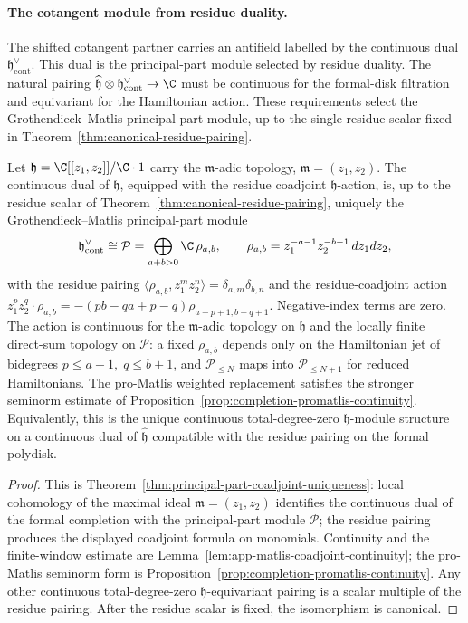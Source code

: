 \documentclass[11pt]{memoir}
\begin{document}
\paragraph{The cotangent module from residue duality.}
The shifted cotangent partner carries an antifield labelled by the
continuous dual \(\mathfrak h^\vee_{\mathrm{cont}}\).  This dual is the
principal-part module selected by residue duality.  The natural pairing
\(\widehat{\mathfrak h}\otimes\mathfrak h^\vee_{\mathrm{cont}}\to\C\)
must be continuous for the formal-disk filtration and equivariant for
the Hamiltonian action.  These requirements select the
Grothendieck--Matlis principal-part module, up to the single residue
scalar fixed in Theorem~\ref{thm:canonical-residue-pairing}.

\begin{thm}\label{thm:hbf-cotangent-uniqueness-summary}
  Let \(\mathfrak h=\C[[z_1,z_2]]/\C\cdot1\) carry the
  \(\mathfrak m\)-adic topology, \(\mathfrak m=(z_1,z_2)\).  The
  continuous dual of \(\mathfrak h\), equipped with the residue
  coadjoint \(\mathfrak h\)-action, is, up to the residue scalar of
  Theorem~\ref{thm:canonical-residue-pairing}, uniquely the
  Grothendieck--Matlis principal-part module
  \[
    \mathfrak h^\vee_{\mathrm{cont}}\cong\mathcal P
    =\bigoplus_{a+b>0}\C\,\rho_{a,b},\qquad
    \rho_{a,b}=z_1^{-a-1}z_2^{-b-1}\,dz_1dz_2,
  \]
  with the residue pairing
  \(\langle\rho_{a,b},z_1^mz_2^n\rangle=\delta_{a,m}\delta_{b,n}\) and
  the residue-coadjoint action
  \(z_1^pz_2^q\cdot\rho_{a,b}=-(pb-qa+p-q)\rho_{a-p+1,b-q+1}\).
  Negative-index terms are zero.  The action is continuous for the
  \(\mathfrak m\)-adic topology on \(\mathfrak h\) and the locally
  finite direct-sum topology on \(\mathcal P\): a fixed
  \(\rho_{a,b}\) depends only on the Hamiltonian jet of bidegrees
  \(p\leq a+1,\;q\leq b+1\), and
  \(\mathcal P_{\leq N}\) maps into \(\mathcal P_{\leq N+1}\) for
  reduced Hamiltonians.  The pro-Matlis weighted replacement satisfies
  the stronger seminorm estimate of
  Proposition~\ref{prop:completion-promatlis-continuity}.  Equivalently,
  this is the unique continuous total-degree-zero \(\mathfrak h\)-module
  structure on a continuous dual of \(\widehat{\mathfrak h}\) compatible
  with the residue pairing on the formal polydisk.
\end{thm}

\begin{proof}
  This is Theorem~\ref{thm:principal-part-coadjoint-uniqueness}: local
  cohomology \cite{matlis-injective} of the maximal ideal
  \(\mathfrak m=(z_1,z_2)\) identifies the continuous dual of the
  formal completion with the principal-part module \(\mathcal P\); the
  residue pairing produces the displayed coadjoint formula on
  monomials.  Continuity and the finite-window estimate are
  Lemma~\ref{lem:app-matlis-coadjoint-continuity}; the pro-Matlis
  seminorm form is Proposition~\ref{prop:completion-promatlis-continuity}.
  Any other continuous total-degree-zero \(\mathfrak h\)-equivariant
  pairing is a scalar multiple of the residue pairing.  After the
  residue scalar is fixed, the isomorphism is canonical.
\end{proof}
\end{document}
